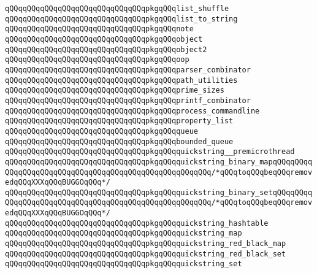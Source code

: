 \verb|qQQqqQQqqQQqqQQqqQQqqQQqqQQqqQQqpkgqQQqlist_shuffle|\newline
\verb|qQQqqQQqqQQqqQQqqQQqqQQqqQQqqQQqpkgqQQqlist_to_string|\newline
\verb|qQQqqQQqqQQqqQQqqQQqqQQqqQQqqQQqpkgqQQqnote|\newline
\verb|qQQqqQQqqQQqqQQqqQQqqQQqqQQqqQQqpkgqQQqobject|\newline
\verb|qQQqqQQqqQQqqQQqqQQqqQQqqQQqqQQqpkgqQQqobject2|\newline
\verb|qQQqqQQqqQQqqQQqqQQqqQQqqQQqqQQqpkgqQQqoop|\newline
\verb|qQQqqQQqqQQqqQQqqQQqqQQqqQQqqQQqpkgqQQqparser_combinator|\newline
\verb|qQQqqQQqqQQqqQQqqQQqqQQqqQQqqQQqpkgqQQqpath_utilities|\newline
\verb|qQQqqQQqqQQqqQQqqQQqqQQqqQQqqQQqpkgqQQqprime_sizes|\newline
\verb|qQQqqQQqqQQqqQQqqQQqqQQqqQQqqQQqpkgqQQqprintf_combinator|\newline
\verb|qQQqqQQqqQQqqQQqqQQqqQQqqQQqqQQqpkgqQQqprocess_commandline|\newline
\verb|qQQqqQQqqQQqqQQqqQQqqQQqqQQqqQQqpkgqQQqproperty_list|\newline
\verb|qQQqqQQqqQQqqQQqqQQqqQQqqQQqqQQqpkgqQQqqueue|\newline
\verb|qQQqqQQqqQQqqQQqqQQqqQQqqQQqqQQqpkgqQQqbounded_queue|\newline
\verb|qQQqqQQqqQQqqQQqqQQqqQQqqQQqqQQqpkgqQQqquickstring__premicrothread|\newline
\verb|qQQqqQQqqQQqqQQqqQQqqQQqqQQqqQQqpkgqQQqquickstring_binary_mapqQQqqQQqqQQqqQQqqQQqqQQqqQQqqQQqqQQqqQQqqQQqqQQqqQQqqQQq/*qQQqtoqQQqbeqQQqremovedqQQqXXXqQQqBUGGOqQQq*/|\newline
\verb|qQQqqQQqqQQqqQQqqQQqqQQqqQQqqQQqpkgqQQqquickstring_binary_setqQQqqQQqqQQqqQQqqQQqqQQqqQQqqQQqqQQqqQQqqQQqqQQqqQQqqQQq/*qQQqtoqQQqbeqQQqremovedqQQqXXXqQQqBUGGOqQQq*/|\newline
\verb|qQQqqQQqqQQqqQQqqQQqqQQqqQQqqQQqpkgqQQqquickstring_hashtable|\newline
\verb|qQQqqQQqqQQqqQQqqQQqqQQqqQQqqQQqpkgqQQqquickstring_map|\newline
\verb|qQQqqQQqqQQqqQQqqQQqqQQqqQQqqQQqpkgqQQqquickstring_red_black_map|\newline
\verb|qQQqqQQqqQQqqQQqqQQqqQQqqQQqqQQqpkgqQQqquickstring_red_black_set|\newline
\verb|qQQqqQQqqQQqqQQqqQQqqQQqqQQqqQQqpkgqQQqquickstring_set|\newline
